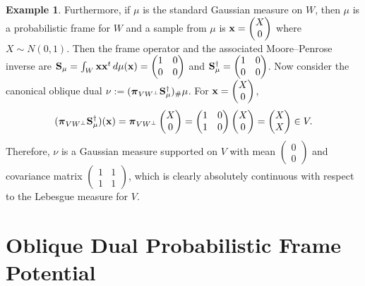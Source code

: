 \documentclass{amsart}
\numberwithin{equation}{section}
\newcommand{\bpi}{{\boldsymbol{\pi}}}
\theoremstyle{plain}
\theoremstyle{remark}
\theoremstyle{definition}
\newtheorem{example}[theorem]{Example}
\begin{document}
\begin{example}
Furthermore, if $\mu$ is the standard Gaussian measure on $W$, then $\mu$ is a probabilistic frame for $W$ and a sample from $\mu$ is ${\bf x} = \begin{pmatrix}
        X \\0
    \end{pmatrix}$ where $X \sim N(0,1)$. 
Then the frame operator and the associated Moore–Penrose inverse are $
{\bf S}_\mu = 
\int_W {\bf x}{\bf x}^t\, d\mu({\bf x}) = 
\begin{pmatrix}
1 & 0 \\
0 & 0
\end{pmatrix} $ and $
{\bf S}_\mu^{\dagger} = 
\begin{pmatrix}
1 & 0 \\
0 & 0
\end{pmatrix}
$.
Now consider the canonical oblique dual $\nu := (\bpi_{VW^\perp}{\bf S}_\mu^{\dagger})_\# \mu$. 
For ${\bf x} = \begin{pmatrix}
        X \\0
    \end{pmatrix}$, 
$$(\bpi_{VW^\perp}{\bf S}_\mu^{\dagger})({\bf x})
= \bpi_{VW^\perp}\begin{pmatrix}
        X \\0
    \end{pmatrix} =  \begin{pmatrix}
1 & 0 \\
1 & 0
\end{pmatrix} \begin{pmatrix}
        X \\0
    \end{pmatrix} = \begin{pmatrix}
        X \\ X
    \end{pmatrix} \in V. $$
Therefore, $\nu$ is a Gaussian measure supported on $V$ with mean $\begin{pmatrix}
        0 \\0
    \end{pmatrix}$ and covariance matrix  $\begin{pmatrix}
1 & 1 \\
1 & 1
\end{pmatrix}$, 
which is clearly absolutely continuous with respect to the Lebesgue measure for $V$. 
\end{example}





\section{Oblique Dual Probabilistic Frame Potential}\label{section:probabilisticDualPotential}
\end{document}
